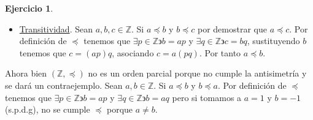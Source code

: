 \documentclass[11pt,letterpaper]{article}
\theoremstyle{definition}\newtheorem{p}{Ejercicio}
\theoremstyle{definition}\newtheorem{pp}[p]{$(*)$Ejercicio}
\numberwithin{p}{section}
\newcommand{\Z}{\mathbb{Z}}
\begin{document}
\begin{p}
\begin{itemize}
    \item \underline{Transitividad}. Sean $a, b, c \in \Z$. Si $a \preccurlyeq b$ y $b \preccurlyeq c$ 
      por demostrar que $a \preccurlyeq c$.
      Por definición de $\preccurlyeq$ tenemos que $\exists p \in \Z \backepsilon b=ap$ y 
      $\exists q \in \Z \backepsilon c=bq$, sustituyendo $b$ tenemos que $c=(ap)q$, asociando
      $c=a(pq)$. Por tanto $a \preccurlyeq b$.      
  \end{itemize}
    
    Ahora bien $(\Z, \preccurlyeq)$ no es un orden parcial porque no cumple la antisimetría y 
    se dará un contraejemplo.
    Sean $a, b \in \Z$. Si $a \preccurlyeq b$ y $b \preccurlyeq a$. Por definición de $\preccurlyeq$ 
    tenemos que $\exists p \in \Z \backepsilon b=ap$ y $\exists q \in \Z \backepsilon b=aq$ pero si 
    tomamos a $a=1$ y $b=-1$ (s.p.d.g), no se cumple $\preccurlyeq$ porque $a \neq b$.
\end{p}
\end{document}
